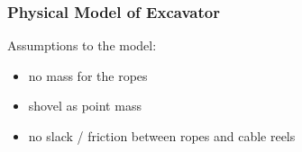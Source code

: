 %

\begin{frame}
	\frametitle{Physical Model of Excavator}
	
	Assumptions to the model:\\
	\vspace{0.6cm}
	\begin{itemize}
		\item no mass for the ropes
		\item shovel as point mass %
		\item no slack / friction between ropes and cable reels
	\end{itemize}
	
\end{frame}


